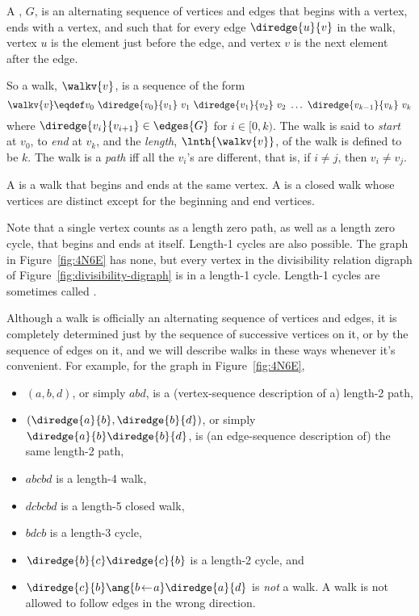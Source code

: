 \begin{definition}\label{def:digraph-walks}
A , $G$, is an alternating sequence of
vertices and edges that begins with a vertex, ends with a vertex, and
such that for every edge $\diredge{u}{v}$ in the walk, vertex $u$ is
the element just before the edge, and vertex $v$ is the next element
after the edge.

So a walk, $\walkv{v}$, is a sequence of the form
\[
\walkv{v} \eqdef v_0\ \diredge{v_0}{v_1}\
v_1\  \diredge{v_1}{v_2}\  v_2\  \dots\  \diredge{v_{k-1}}{v_k}\  v_k
\]
where $\diredge{v_i}{v_{i+1}} \in \edges{G}$ for $i \in [0,k)$.
  The walk is said to \emph{start} at $v_0$, to \emph{end} at $v_k$,
  and the \emph{length}, $\lnth{\walkv{v}}$, of the walk is defined to be
  $k$.  The walk is a \emph{path} iff all the $v_i$'s are different,
  that is, if $i \neq j$, then $v_i \neq v_j$.

A  is a walk that begins and ends at the same
vertex.  A  is a closed walk whose vertices are distinct
except for the beginning and end vertices.
\end{definition}
Note that a single vertex counts as a length zero path, as well as a
length zero cycle, that begins and ends at itself.  Length-1 cycles
are also possible.  The graph in Figure~\ref{fig:4N6E} has none, but
every vertex in the divisibility relation digraph of
Figure~\ref{fig:divisibility-digraph} is in a length-1 cycle.
Length-1 cycles are sometimes called .

Although a walk is officially an alternating sequence of vertices and
edges, it is completely determined just by the sequence of successive
vertices on it, or by the sequence of edges on it, and we will
describe walks in these ways whenever it's convenient.  For example,
for the graph in Figure~\ref{fig:4N6E},
\begin{itemize}

\item $(a, b, d)$, or simply $abd$, is a (vertex-sequence description
  of a) length-2 path,

\item $(\diredge{a}{b}, \diredge{b}{d})$, or simply
  $\diredge{a}{b}\diredge{b}{d}$, is (an edge-sequence description of)
  the same length-2 path,

\item $abcbd$ is a length-4 walk,

\item $dcbcbd$ is a length-5 closed walk,

\item $bdcb$ is a length-3 cycle,

\item $\diredge{b}{c}\diredge{c}{b}$ is a length-2 cycle, and

\item $\diredge{c}{b}\ang{b\! \leftarrow\! a}\diredge{a}{d}$
  is \emph{not} a walk.  A walk is not allowed to follow
  edges in the wrong direction.
\end{itemize}


